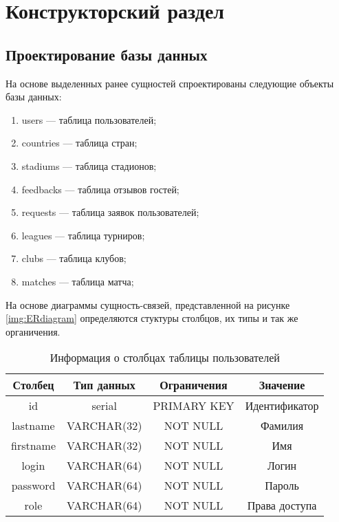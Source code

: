 \section{Конструкторский раздел}

\subsection{Проектирование базы данных}

На основе выделенных ранее сущностей спроектированы следующие объекты базы данных:
\begin{enumerate}
	\item users --- таблица пользователей;
	\item countries --- таблица стран;
	\item stadiums --- таблица стадионов;
	\item feedbacks --- таблица отзывов гостей;
	\item requests --- таблица заявок пользователей;
	\item leagues --- таблица турниров;
	\item clubs --- таблица клубов;
	\item matches --- таблица матча;
\end{enumerate}

На основе диаграммы сущность-связей, представленной на рисунке \ref{img:ERdiagram} определяются стуктуры столбцов, их типы и так же органичения.

\begin{table}[H]
	\begin{center}
		\caption{Информация о столбцах таблицы пользователей}
		\begin{tabular}{|c|c|c|c|}
			\hline
			Столбец & Тип данных & Ограничения & Значение \\
			\hline
			id & serial & PRIMARY KEY & Идентификатор \\
			\hline
			lastname & VARCHAR(32) & NOT NULL & Фамилия \\
			\hline
			firstname & VARCHAR(32) & NOT NULL & Имя\\
			\hline
			login & VARCHAR(64) & NOT NULL &  Логин \\
			\hline
			password & VARCHAR(64) & NOT NULL & Пароль \\
			\hline
			role & VARCHAR(64) & NOT NULL & Права доступа \\
			\hline
		\end{tabular}
		\label{table:db:users}
	\end{center}
\end{table}

